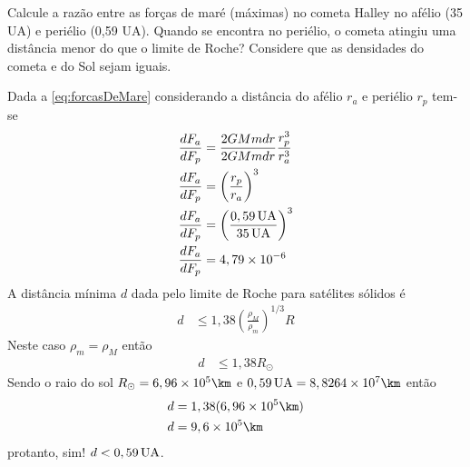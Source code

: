 \begin{prob}
	Calcule a razão entre as forças de maré (máximas) no cometa Halley no afélio (35 UA) e
	periélio (0,59 UA). Quando se encontra no periélio, o cometa atingiu uma distância menor do que o limite de Roche? Considere que as densidades do cometa e do Sol sejam iguais.
	\begin{sol}
		Dada a \autoref{eq:forcasDeMare} considerando a distância do afélio $r_a$ e periélio $r_p$ tem-se
		\begin{align}
			\frac{dF_a}{dF_p}&=\frac{2GMmdr}{2GMmdr}\frac{r_p^3}{r_a^3}\\\nonumber
			\frac{dF_a}{dF_p}&=\left(\frac{r_p}{r_a}\right)^3\\\nonumber
			\frac{dF_a}{dF_p}&=\left(\frac{0,59\au}{35\au}\right)^3\\\nonumber
			\frac{dF_a}{dF_p}&=4,79\times 10^{-6}
		\end{align}
		A distância mínima $d$ dada pelo limite de Roche para satélites sólidos é 
		\begin{align}
			d&\leq 1,38\left(\frac{\rho_M}{\rho_m}\right)^{1/3}R
			\label{eq:limiteRoche}
		\end{align}
		Neste caso $\rho_m=\rho_M$ então
		\begin{align}
			d&\leq1,38R_\odot
		\end{align}
		Sendo o raio do sol $R_\odot=6,96\times 10^{5}\km$ e $0,59\au=8,8264\times 10^{7}\km$ então
		\begin{align}
			d&=1,38(6,96\times 10^{5}\km)\\\nonumber
			d&=9,6\times 10^5\km
		\end{align}
		protanto, sim! $d<0,59\au$.

	\end{sol}
\end{prob}
